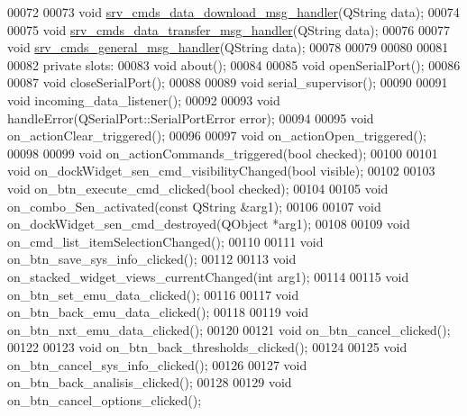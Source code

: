 \begin{DoxyCode}
00072 
00073     \textcolor{keywordtype}{void} \hyperlink{a00006_ac84167866950dd1eb9a29a5293546c1a}{srv\_cmds\_data\_download\_msg\_handler}(QString data);
00074 
00075     \textcolor{keywordtype}{void} \hyperlink{a00006_ae19ec21c1009c81700a8ad2e1f81be07}{srv\_cmds\_data\_transfer\_msg\_handler}(QString data);
00076 
00077     \textcolor{keywordtype}{void} \hyperlink{a00006_a8a8cd34488e8ee213350afb5b2261677}{srv\_cmds\_general\_msg\_handler}(QString data);
00078 
00079 
00080 
00081 
00082 \textcolor{keyword}{private} slots:
00083     \textcolor{keywordtype}{void} about();
00084 
00085     \textcolor{keywordtype}{void} openSerialPort();
00086 
00087     \textcolor{keywordtype}{void} closeSerialPort();
00088 
00089     \textcolor{keywordtype}{void} serial\_supervisor();
00090 
00091     \textcolor{keywordtype}{void} incoming\_data\_listener();
00092 
00093     \textcolor{keywordtype}{void} handleError(QSerialPort::SerialPortError error);
00094 
00095     \textcolor{keywordtype}{void} on\_actionClear\_triggered();
00096 
00097     \textcolor{keywordtype}{void} on\_actionOpen\_triggered();
00098 
00099     \textcolor{keywordtype}{void} on\_actionCommands\_triggered(\textcolor{keywordtype}{bool} checked);
00100 
00101     \textcolor{keywordtype}{void} on\_dockWidget\_sen\_cmd\_visibilityChanged(\textcolor{keywordtype}{bool} visible);
00102 
00103     \textcolor{keywordtype}{void} on\_btn\_execute\_cmd\_clicked(\textcolor{keywordtype}{bool} checked);
00104 
00105     \textcolor{keywordtype}{void} on\_combo\_Sen\_activated(\textcolor{keyword}{const} QString &arg1);
00106 
00107     \textcolor{keywordtype}{void} on\_dockWidget\_sen\_cmd\_destroyed(QObject *arg1);
00108 
00109     \textcolor{keywordtype}{void} on\_cmd\_list\_itemSelectionChanged();
00110 
00111     \textcolor{keywordtype}{void} on\_btn\_save\_sys\_info\_clicked();
00112 
00113     \textcolor{keywordtype}{void} on\_stacked\_widget\_views\_currentChanged(\textcolor{keywordtype}{int} arg1);
00114 
00115     \textcolor{keywordtype}{void} on\_btn\_set\_emu\_data\_clicked();
00116 
00117     \textcolor{keywordtype}{void} on\_btn\_back\_emu\_data\_clicked();
00118 
00119     \textcolor{keywordtype}{void} on\_btn\_nxt\_emu\_data\_clicked();
00120 
00121     \textcolor{keywordtype}{void} on\_btn\_cancel\_clicked();
00122 
00123     \textcolor{keywordtype}{void} on\_btn\_back\_thresholds\_clicked();
00124 
00125     \textcolor{keywordtype}{void} on\_btn\_cancel\_sys\_info\_clicked();
00126 
00127     \textcolor{keywordtype}{void} on\_btn\_back\_analisis\_clicked();
00128 
00129     \textcolor{keywordtype}{void} on\_btn\_cancel\_options\_clicked();

\end{DoxyCode}
